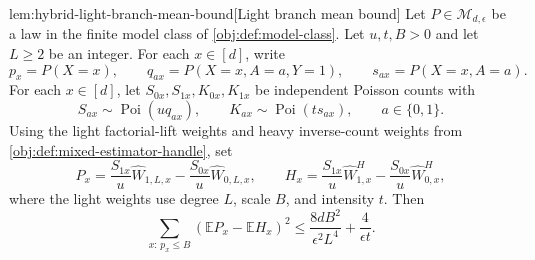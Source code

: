 \documentclass[11pt]{article}
\begin{document}
\begin{lemmav}{lem:hybrid-light-branch-mean-bound}[Light branch mean bound]
Let \(P\in\mathcal M_{d,\epsilon}\) be a law in the finite model class of \cref{obj:def:model-class}.  Let \(u,t,B>0\) and let \(L\ge 2\) be an integer.  For each \(x\in[d]\), write
\[
p_x=P(X=x),\qquad
q_{ax}=P(X=x,A=a,Y=1),\qquad
s_{ax}=P(X=x,A=a).
\]
For each \(x\in[d]\), let \(S_{0x},S_{1x},K_{0x},K_{1x}\) be independent Poisson counts with
\[
S_{ax}\sim \operatorname{Poi}(u q_{ax}),
\qquad
K_{ax}\sim \operatorname{Poi}(t s_{ax}),
\qquad a\in\{0,1\}.
\]
Using the light factorial-lift weights and heavy inverse-count weights from \cref{obj:def:mixed-estimator-handle}, set
\[
P_x
=
\frac{S_{1x}}{u}\widehat W_{1,L,x}
-
\frac{S_{0x}}{u}\widehat W_{0,L,x},
\qquad
H_x
=
\frac{S_{1x}}{u}\widehat W^H_{1,x}
-
\frac{S_{0x}}{u}\widehat W^H_{0,x},
\]
where the light weights use degree \(L\), scale \(B\), and intensity \(t\).  Then
\[
\sum_{x:\,p_x\le B}
\left(\mathbb E P_x-\mathbb E H_x\right)^2
\le
\frac{8dB^2}{\epsilon^2 L^4}
+
\frac{4}{\epsilon t}.
\]
\end{lemmav}
\end{document}
